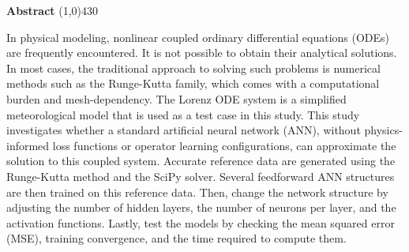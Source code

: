 \setlength{\headheight}{14pt}
\begin{center}
	{\huge \bf Abstract}
	\line(1,0){430}
\end{center}
In physical modeling, nonlinear coupled ordinary differential equations (ODEs) are frequently encountered. It is not possible to obtain their analytical solutions. In most cases, the traditional approach to solving such problems is numerical methods such as the Runge-Kutta family, which comes with a computational burden and mesh-dependency. The Lorenz ODE system is a simplified meteorological model that is used as a test case in this study. This study investigates whether a standard artificial neural network (ANN), without physics-informed loss functions or operator learning configurations, can approximate the solution to this coupled system. Accurate reference data are generated using the Runge-Kutta method and the SciPy solver. Several feedforward ANN structures are then trained on this reference data. Then, change the network structure by adjusting the number of hidden layers, the number of neurons per layer, and the activation functions. Lastly, test the models by checking the mean squared error (MSE), training convergence, and the time required to compute them.

\clearpage
\setlength{\headheight}{12pt}